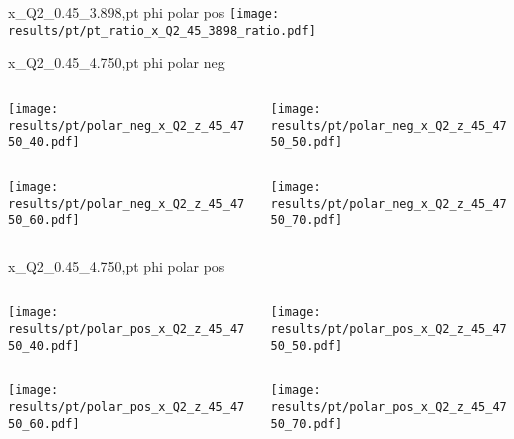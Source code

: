 \begin{frame}{x\_Q2\_0.45\_3.898,pt phi polar pos}
\texttt{[image: results/pt/pt\_ratio\_x\_Q2\_45\_3898\_ratio.pdf]}
\end{frame}
\begin{frame}{x\_Q2\_0.45\_4.750,pt phi polar neg}
\begin{columns}
\begin{column}[T]{0.5\textwidth}
\texttt{[image: results/pt/polar\_neg\_x\_Q2\_z\_45\_4750\_40.pdf]}
\end{column}
\begin{column}[T]{0.5\textwidth}
\texttt{[image: results/pt/polar\_neg\_x\_Q2\_z\_45\_4750\_50.pdf]}
\end{column}
\end{columns}
\begin{columns}
\begin{column}[T]{0.5\textwidth}
\texttt{[image: results/pt/polar\_neg\_x\_Q2\_z\_45\_4750\_60.pdf]}
\end{column}
\begin{column}[T]{0.5\textwidth}
\texttt{[image: results/pt/polar\_neg\_x\_Q2\_z\_45\_4750\_70.pdf]}
\end{column}
\end{columns}
\end{frame}
\begin{frame}{x\_Q2\_0.45\_4.750,pt phi polar pos}
\begin{columns}
\begin{column}[T]{0.5\textwidth}
\texttt{[image: results/pt/polar\_pos\_x\_Q2\_z\_45\_4750\_40.pdf]}
\end{column}
\begin{column}[T]{0.5\textwidth}
\texttt{[image: results/pt/polar\_pos\_x\_Q2\_z\_45\_4750\_50.pdf]}
\end{column}
\end{columns}
\begin{columns}
\begin{column}[T]{0.5\textwidth}
\texttt{[image: results/pt/polar\_pos\_x\_Q2\_z\_45\_4750\_60.pdf]}
\end{column}
\begin{column}[T]{0.5\textwidth}
\texttt{[image: results/pt/polar\_pos\_x\_Q2\_z\_45\_4750\_70.pdf]}
\end{column}
\end{columns}
\end{frame}
